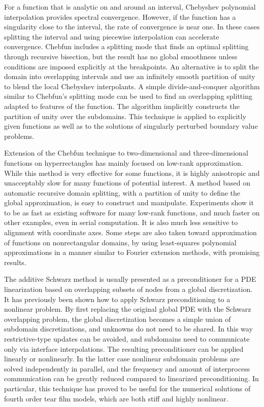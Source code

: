 For a function that is analytic on and around an interval, Chebyshev polynomial
interpolation provides spectral convergence. However, if the function has a singularity close to the
interval, the rate of convergence is near one. In these cases splitting the interval and using piecewise
interpolation can accelerate convergence. Chebfun includes a splitting mode that finds an optimal
splitting through recursive bisection, but the result has no global smoothness unless conditions are
imposed explicitly at the breakpoints. An alternative is to split the domain into overlapping intervals
and use an infinitely smooth partition of unity to blend the local Chebyshev interpolants. A simple
divide-and-conquer algorithm similar to Chebfun’s splitting mode can be used to find an overlapping
splitting adapted to features of the function. The algorithm implicitly constructs the partition of
unity over the subdomains. This technique is applied to explicitly given functions as well as to the
solutions of singularly perturbed boundary value problems.

Extension of the Chebfun technique to two-dimensional and three-dimensional functions on hyperrectangles has mainly focused on low-rank approximation. While this method is very effective for some functions, it is highly anisotropic and unacceptably slow for many functions of potential interest. A method based on automatic recursive domain splitting, with a partition of unity to define the global approximation, is easy to construct and manipulate. Experiments show it to be as fast as existing software for many low-rank functions, and much faster on other examples, even in serial computation. It is also much less sensitive to alignment with coordinate axes. Some steps are also taken toward approximation of functions on nonrectangular domains, by using least-squares polynomial approximations in a manner similar to Fourier extension methods, with promising results. 

The additive Schwarz method is usually presented as a preconditioner for a PDE linearization based on overlapping subsets of nodes from a global discretization. It has previously been shown how to apply Schwarz preconditioning to a nonlinear problem. By first replacing the original global PDE with the Schwarz overlapping problem, the global discretization becomes a simple union of subdomain discretizations, and unknowns do not need to be shared. In this way restrictive-type updates can be avoided, and subdomains need to communicate only via interface interpolations. The resulting preconditioner can be applied linearly or nonlinearly. In the latter case nonlinear subdomain problems are solved independently in parallel, and the frequency and amount of interprocess communication can be greatly reduced compared to linearized preconditioning. In particular, this technique has proved to be useful for the numerical solutions of fourth order tear film models, which are both stiff and highly nonlinear.

